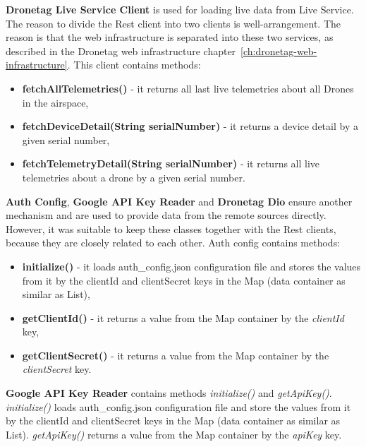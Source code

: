 \textbf{Dronetag Live Service Client} is used for loading live data from Live Service.
The reason to divide the Rest client into two clients is well-arrangement.
The reason is that the web infrastructure is separated into these two services, as described in the Dronetag web infrastructure chapter~\ref{ch:dronetag-web-infrastructure}.
This client contains methods:
\begin{itemize}
    \item \textbf{fetchAllTelemetries()} - it returns all last live telemetries about all Drones in the airspace,
    \item \textbf{fetchDeviceDetail(String serialNumber)} - it returns a device detail by a given serial number,
    \item \textbf{fetchTelemetryDetail(String serialNumber)} - it returns all live telemetries about a drone by a given serial number.
\end{itemize}

\textbf{Auth Config}, \textbf{Google API Key Reader} and \textbf{Dronetag Dio} ensure another mechanism and are used to provide data from the remote sources directly.
However, it was suitable to keep these classes together with the Rest clients, because they are closely related to each other.
Auth config contains methods:
\begin{itemize}
    \item \textbf{initialize()} - it loads auth\_config.json configuration file and stores the values from it by the clientId and clientSecret keys in the Map (data container as similar as List),
    \item \textbf{getClientId()} - it returns a value from the Map container by the \textit{clientId} key,
    \item \textbf{getClientSecret()} - it returns a value from the Map container by the \textit{clientSecret} key.
\end{itemize}
\textbf{Google API Key Reader} contains methods \textit{initialize()} and \textit{getApiKey()}.
\textit{initialize()} loads auth\_config.json configuration file and store the values from it by the clientId and clientSecret keys in the Map (data container as similar as List).
\textit{getApiKey()} returns a value from the Map container by the \textit{apiKey} key.
